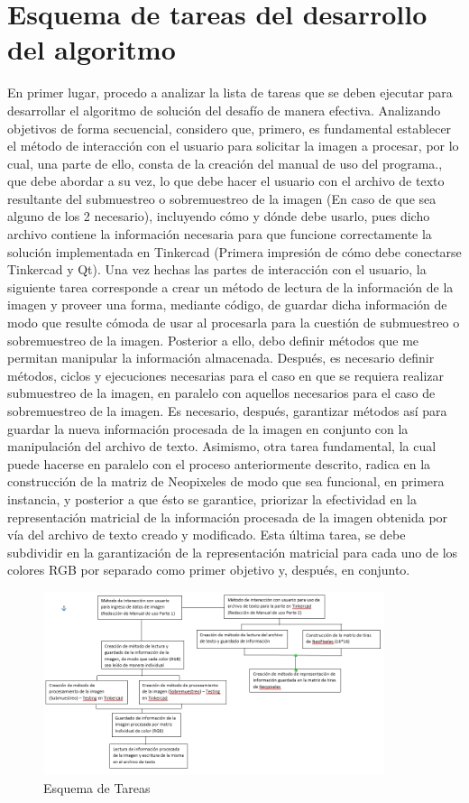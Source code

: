 \documentclass{article}
\begin{document}
 \section{Esquema de tareas del desarrollo del algoritmo}
 En primer lugar, procedo a analizar la lista de tareas que se deben ejecutar para desarrollar el algoritmo de solución del desafío de manera efectiva. Analizando objetivos de forma secuencial, considero que, primero, es fundamental establecer el método de interacción con el usuario para solicitar la imagen a procesar, por lo cual, una parte de ello, consta de la creación del manual de uso del programa., que debe abordar a su vez, lo que debe hacer el usuario con el archivo de texto resultante del submuestreo o sobremuestreo de la imagen (En caso de que sea alguno de los 2 necesario), incluyendo cómo y dónde debe usarlo, pues dicho archivo contiene la información necesaria para que funcione correctamente la solución implementada en Tinkercad (Primera impresión de cómo debe conectarse Tinkercad y Qt). Una vez hechas las partes de interacción con el usuario, la siguiente tarea corresponde a crear un método de lectura de la información de la imagen y proveer una forma, mediante código, de guardar dicha información de modo que resulte cómoda de usar al procesarla para la cuestión de submuestreo o sobremuestreo de la imagen. Posterior a ello, debo definir métodos que me permitan manipular la información almacenada. Después, es necesario definir métodos, ciclos y ejecuciones necesarias para el caso en que se requiera realizar submuestreo de la imagen, en paralelo con aquellos necesarios para el caso de sobremuestreo de la imagen. Es necesario, después, garantizar métodos así para guardar la nueva información procesada de la imagen en conjunto con la manipulación del archivo de texto. Asimismo, otra tarea fundamental, la cual puede hacerse en paralelo con el proceso anteriormente descrito, radica en la construcción de la matriz de Neopixeles de modo que sea funcional, en primera instancia, y posterior a que ésto se garantice, priorizar la efectividad en la representación matricial de la información procesada de la imagen obtenida por vía del archivo de texto creado y modificado. Esta última tarea, se debe subdividir en la garantización de la representación matricial para cada uno de los colores RGB por separado como primer objetivo y, después, en conjunto.
  \begin{figure}[h]
    \includegraphics[width=10cm]{Esquema_Tareas.png}
    \centering
    \caption{Esquema de Tareas}
    \label{fig:esquema_tareas}
 \end{figure}
\end{document}
